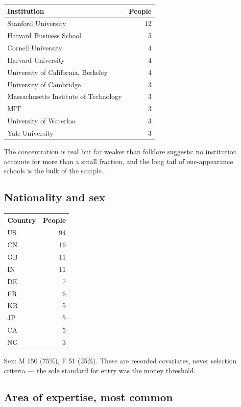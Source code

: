 \documentclass[11pt]{article}
\begin{document}
\begin{center}\begin{tabular}{lr}\toprule Institution & People \\\midrule
Stanford University & 12 \\
Harvard Business School & 5 \\
Cornell University & 4 \\
Harvard University & 4 \\
University of California, Berkeley & 4 \\
University of Cambridge & 3 \\
Massachusetts Institute of Technology & 3 \\
MIT & 3 \\
University of Waterloo & 3 \\
Yale University & 3 \\
\bottomrule\end{tabular}\end{center}
The concentration is real but far weaker than folklore suggests: no institution accounts for more than a small fraction, and the long tail of one-appearance schools is the bulk of the sample.

\subsection{Nationality and sex}

\begin{center}\begin{tabular}{lr}\toprule Country & People \\\midrule
US & 94 \\
CN & 16 \\
GB & 11 \\
IN & 11 \\
DE & 7 \\
FR & 6 \\
KR & 5 \\
JP & 5 \\
CA & 5 \\
NG & 3 \\
\bottomrule\end{tabular}\end{center}
Sex: M 150 (75\%), F 51 (25\%). These are recorded covariates, never selection criteria --- the sole standard for entry was the money threshold.

\subsection{Area of expertise, most common}
\end{document}
